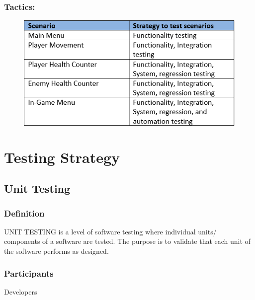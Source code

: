 \documentclass{article}
\begin{document}
\subsubsection{Tactics:}
\begin{figure}
    \centering
    \includegraphics[scale=0.9]{./images/tactics.PNG}
\end{figure}

\newpage

\section{Testing Strategy}

\subsection{Unit Testing}
\subsubsection{Definition}
UNIT TESTING is a level of software testing where individual units/ components of a software are tested. The purpose is to validate that each unit of the software performs as designed.
\subsubsection{Participants}
Developers
\end{document}
